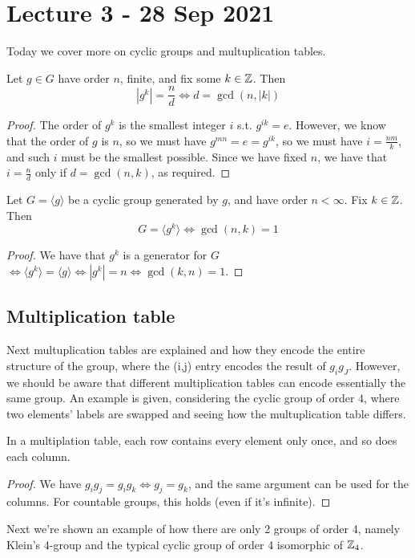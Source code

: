 \section{Lecture 3 - 28 Sep 2021}
Today we cover more on cyclic groups and multuplication tables.
\begin{theorem}
  Let $g\in G$ have order $n$, finite, and fix some $k\in\mathbb Z$. Then
  \[|g^k|= \frac{n}{d} \iff d=\gcd{(n,|k|)}\]
\end{theorem}
\begin{proof}
  The order of $g^k$ is the smallest integer $i$ s.t. $g^{ik}=e$. However, we know that the
  order of $g$ is $n$, so we must have $g^{mn}=e=g^{ik}$, so we must have
  $i=\frac{nm}{k}$, and such $i$ must be the smallest possible. Since we have fixed $n$,
  we have that $i=\frac{n}{d}$ only if $d=\gcd{(n,k)}$, as required.
\end{proof}

\begin{cor}
  Let $G=\langle g \rangle$ be a cyclic group generated by $g$, and have order $n<\infty$. Fix
  $k\in\mathbb Z$. Then
  \[G=\langle g^k \rangle \iff \gcd{(n,k)}=1\]
\end{cor}
\begin{proof}
  We have that $g^k$ is a generator for $G$ $\iff \langle g^k \rangle = \langle g \rangle \iff |g^k|=n \iff
  \gcd{(k,n)}=1$.
\end{proof}


\subsection{Multiplication table}
Next multuplication tables are explained and how they encode the entire structure of the
group, where the (i,j) entry encodes the result of $g_ig_J$. However, we should be aware
that different multiplication tables can encode essentially the same group. An example is
given, considering the cyclic group of order $4$, where two elements' labels are swapped
and seeing how the multuplication table differs.
\begin{theorem}
  In a multiplation table, each row contains every element only once, and so does each
  column. 
\end{theorem}
\begin{proof}
  We have $g_ig_j = g_i g_k \iff g_j=g_k$, and the same argument can be used for the
  columns. For countable groups, this holds (even if it's infinite).
\end{proof}

Next we're shown an example of how there are only 2 groups of order 4, namely Klein's
4-group and the typical cyclic group of order 4 isomorphic of $\mathbb Z_4$.
